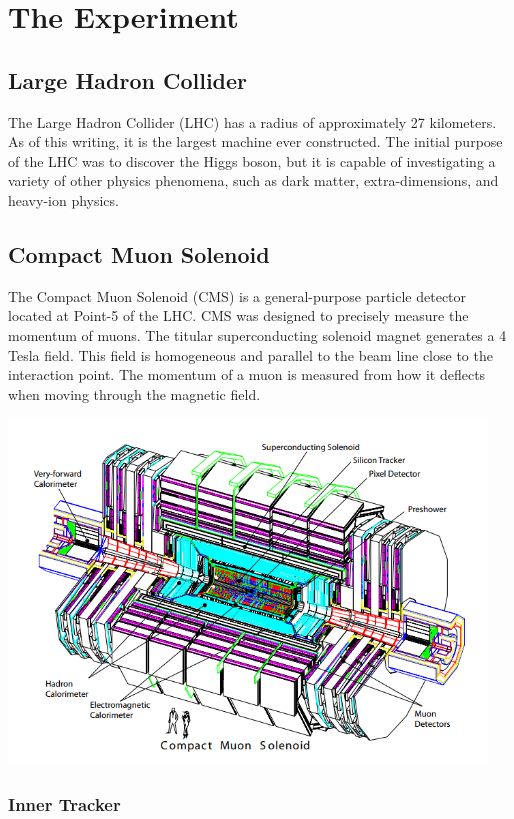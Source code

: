 
\chapter{The Experiment}

\section{Large Hadron Collider}

The Large Hadron Collider (LHC) has a radius of approximately 27 kilometers. As of this writing, it is the largest machine ever constructed. The initial purpose of the LHC was to discover the Higgs boson, but it is capable of investigating a variety of other physics phenomena, such as dark matter, extra-dimensions, and heavy-ion physics.

\section{Compact Muon Solenoid}

The Compact Muon Solenoid (CMS) is a general-purpose particle detector located at Point-5 of the LHC. CMS was designed to precisely measure the momentum of muons. The titular superconducting solenoid magnet generates a 4 Tesla field. This field is homogeneous and parallel to the beam line close to the interaction point. The momentum of a muon is measured from how it deflects when moving through the magnetic field. 

\centerline{
\includegraphics[width=5in]{Chapter3/importfigs/fromCMS_DesignPaper_perspective.png}
}

\subsection{Inner Tracker}

